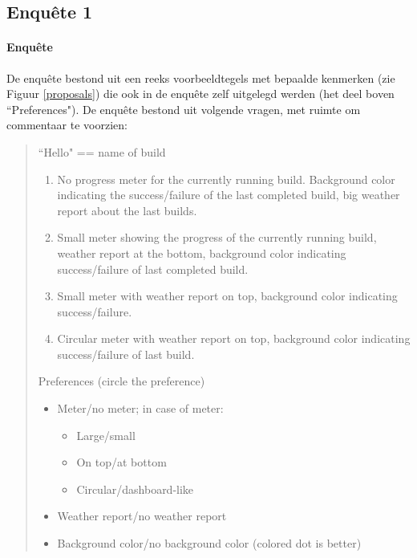 \documentclass[10pt,a4paper]{article}
\begin{document}
\begin{appendices}
\section{Enqu\^ete 1}
\label{enquete1}
\paragraph{Enqu\^ete}
De enqu\^ete bestond uit een reeks voorbeeldtegels met bepaalde kenmerken (zie Figuur \ref{proposals}) die ook in de enqu\^ete zelf uitgelegd werden (het deel boven ``Preferences"). De enqu\^ete bestond uit volgende vragen, met ruimte om commentaar te voorzien:\\

\begin{minipage}{1.1 \textwidth}
\begin{quote}
``Hello" == name of build
\begin{enumerate}
\item No progress meter for the currently running build. Background color indicating the success/failure of the last completed build, big weather report about the last builds.
\item Small meter showing the progress of the currently running build, weather report at the bottom, background color indicating success/failure of last completed build.
\item Small meter with weather report on top, background color indicating success/failure.
\item Circular meter with weather report on top, background color indicating success/failure of last build.
\end{enumerate}
Preferences (circle the preference)
\begin{itemize}
\item Meter/no meter; in case of meter:
\begin{itemize}
\item Large/small
\item On top/at bottom
\item Circular/dashboard-like
\end{itemize}
\item Weather report/no weather report
\item Background color/no background color (colored dot is better)
\end{itemize}
\end{quote}

\end{minipage}


\end{appendices}
\end{document}
